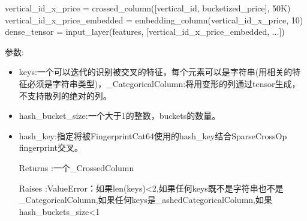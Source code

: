 \begin{python}
vertical_id_x_price = crossed_column([vertical_id, bucketized_price], 50K)
vertical_id_x_price_embedded = embedding_column(vertical_id_x_price, 10)
dense_tensor = input_layer(features, [vertical_id_x_price_embedded, ...])
\end{python}
参数:
\begin{itemize}
	\item keys:一个可以迭代的识别被交叉的特征，每个元素可以是字符串(用相关的特征必须是字符串类型)，\_CategoricalColumn:将用变形的列通过tensor生成，不支持散列的绝对的列。
	\item hash\_bucket\_size:一个大于1的整数，buckets的数量。
	\item hash\_key:指定将被FingerprintCat64使用的hash\_key结合SparseCrossOp fingerprint交叉。
	\item[Returns]:一个\_CrossedColumn
	\item[Raises]:ValueError：如果len(keys)<2,如果任何keys既不是字符串也不是\_CategoricalColumn,如果任何keys是\_ashedCategoricalColumn,如果hash\_buckets\_size<1
\end{itemize}
